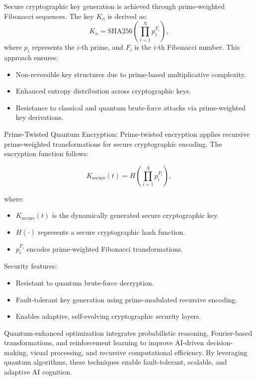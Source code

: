 
\pa Secure cryptographic key generation is achieved through prime-weighted Fibonacci sequences. The key $K_n$ is derived as:
\begin{equation}
K_n = \text{SHA256} \left( \prod_{i=1}^{N} p_i^{F_i} \right),
\end{equation}
where $p_i$ represents the $i$-th prime, and $F_i$ is the $i$-th Fibonacci number. This approach ensures:
\begin{itemize}
    \item Non-reversible key structures due to prime-based multiplicative complexity.
    \item Enhanced entropy distribution across cryptographic keys.
    \item Resistance to classical and quantum brute-force attacks via prime-weighted key derivations.
\end{itemize}

\pa Prime-Twisted Quantum Encryption: Prime-twisted encryption applies recursive prime-weighted transformations for secure cryptographic encoding. The encryption function follows:

\begin{equation}
K_{\text{secure}}(t) = H \left(\prod_{i=1}^{N} p_i^{F_i} \right),
\end{equation}

where:
\begin{itemize}
    \item $K_{\text{secure}}(t)$ is the dynamically generated secure cryptographic key.
    \item $H(\cdot)$ represents a secure cryptographic hash function.
    \item $p_i^{F_i}$ encodes prime-weighted Fibonacci transformations.
\end{itemize}

Security features:
\begin{itemize}
    \item Resistant to quantum brute-force decryption.
    \item Fault-tolerant key generation using prime-modulated recursive encoding.
    \item Enables adaptive, self-evolving cryptographic security layers.
\end{itemize}


\pa Quantum-enhanced optimization integrates probabilistic reasoning, Fourier-based transformations, and reinforcement learning to improve AI-driven decision-making, visual processing, and recursive computational efficiency. By leveraging quantum algorithms, these techniques enable fault-tolerant, scalable, and adaptive AI cognition.

